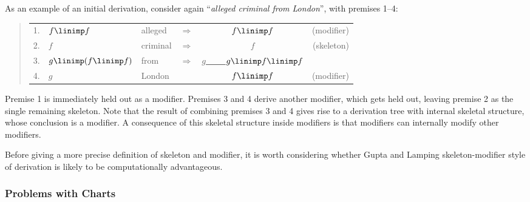As an example of an initial derivation, consider again ``{\em alleged
criminal from London}'', with premises 1--4:
\begin{quote}\small
\begin{tabular}{llllcr}
1. & $f\linimp f$ & alleged &$\Longrightarrow$ & $f\linimp f$ & (modifier)\\
2. & $f$          & criminal&$\Longrightarrow$ & $f$ & (skeleton)\\
3. & $g\linimp(f\linimp f)$ \hspace*{1em} & from&$\Longrightarrow$ & 
                             \underline{$g$ \ \ \ \ $g\linimp f\linimp f$} &\\
4. & $g$          & London & & $f\linimp f$ & (modifier)
\end{tabular}
\end{quote}
Premise 1 is immediately held out as a modifier.
Premises 3 and 4  derive another modifier,
which gets held out, leaving premise 2 as the single remaining skeleton.
Note that the result of combining premises 3 and 4 gives rise to a derivation
tree with internal skeletal structure, whose conclusion is a modifier.
A consequence of this skeletal structure inside modifiers is that modifiers
can internally modify other modifiers.


Before giving a more precise definition of skeleton and modifier, it is worth
considering whether Gupta and Lamping skeleton-modifier style of derivation
is likely to be computationally advantageous.

\subsubsection{Problems with Charts}

